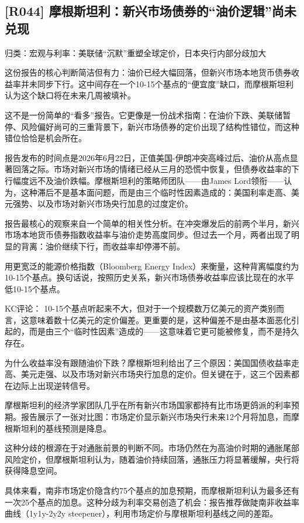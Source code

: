 \documentclass[11pt]{ctexart}
\begin{document}
\subsection{[R044] 摩根斯坦利：新兴市场债券的“油价逻辑”尚未兑现}
{\small\color{refgray}归类：宏观与利率：美联储“沉默”重塑全球定价，日本央行内部分歧加大}

这份报告的核心判断简洁但有力：油价已经大幅回落，但新兴市场本地货币债券收益率并未同步下行。这中间存在一个10-15个基点的“便宜度”缺口，而摩根斯坦利认为这个缺口将在未来几周被填补。

这不是一份简单的“看多”报告。它更像是一份战术指南：在油价下跌、美联储暂停、风险偏好尚可的三重背景下，新兴市场债券的定价出现了结构性错位，而这种错位恰恰是机会所在。

报告发布的时间点是2026年6月22日，正值美国-伊朗冲突高峰过后、油价从高点显著回落之际。市场对新兴市场的情绪已经从三月的恐慌中恢复，但债券收益率的下行幅度远不及油价跌幅。摩根斯坦利的策略师团队——由James Lord领衔——认为，这种滞后不是基本面问题，而是由三个临时性因素造成的：美国利率走高、美元强势、以及市场对新兴市场央行加息的过度定价。

报告最核心的观察来自一个简单的相关性分析。在冲突爆发后的前两个半月，新兴市场本地货币债券指数收益率与油价走势高度同步。但过去一个月，两者出现了明显的背离：油价继续下行，而收益率却停滞不前。

用更宽泛的能源价格指数（Bloomberg Energy Index）来衡量，这种背离幅度约为10-15个基点。换句话说，按照历史关系，新兴市场债券收益率应该比现在的水平低10-15个基点。

KC评论： 10-15个基点听起来不大，但对于一个规模数万亿美元的资产类别而言，这意味着数十亿美元的定价偏差。更重要的是，这种偏差不是由基本面恶化引起的，而是由三个“临时性因素”造成的——这意味着它更可能被修复，而不是持久存在。

为什么收益率没有跟随油价下跌？摩根斯坦利给出了三个原因：美国国债收益率走高、美元走强、以及市场对新兴市场央行加息的定价。但关键在于，这三个因素都在边际上出现逆转信号。

摩根斯坦利的经济学家团队几乎在所有新兴市场国家都持有比市场更鸽派的利率预期。报告展示了一张对比图：市场定价显示新兴市场央行未来12个月将加息，而摩根斯坦利的基线预测是降息。

这种分歧的根源在于对通胀前景的判断不同。市场仍然在为高油价时期的通胀尾部风险定价，但摩根斯坦利认为，随着油价持续回落，通胀压力将显著缓解，央行将获得降息空间。

具体来看，南非市场定价隐含约75个基点的加息预期，而摩根斯坦利认为最多还有一次25个基点的加息。这种分歧为利率交易创造了机会：报告推荐做陡南非收益率曲线（1y1y-2y2y steepener），利用市场定价与摩根斯坦利基线之间的差距。
\end{document}
